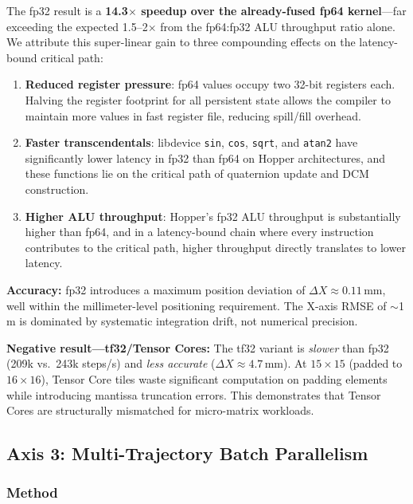 \documentclass[pdflatex,sn-mathphys-num]{sn-jnl}%
\theoremstyle{thmstyleone}%
\theoremstyle{thmstyletwo}%
\theoremstyle{thmstylethree}%
\begin{document}
The fp32 result is a \textbf{14.3$\times$ speedup over the already-fused fp64 kernel}---far exceeding the expected 1.5--2$\times$ from the fp64:fp32 ALU throughput ratio alone. We attribute this super-linear gain to three compounding effects on the latency-bound critical path:

\begin{enumerate}
\item \textbf{Reduced register pressure}: fp64 values occupy two 32-bit registers each. Halving the register footprint for all persistent state allows the compiler to maintain more values in fast register file, reducing spill/fill overhead.
\item \textbf{Faster transcendentals}: libdevice \texttt{sin}, \texttt{cos}, \texttt{sqrt}, and \texttt{atan2} have significantly lower latency in fp32 than fp64 on Hopper architectures, and these functions lie on the critical path of quaternion update and DCM construction.
\item \textbf{Higher ALU throughput}: Hopper's fp32 ALU throughput is substantially higher than fp64, and in a latency-bound chain where every instruction contributes to the critical path, higher throughput directly translates to lower latency.
\end{enumerate}

\textbf{Accuracy:} fp32 introduces a maximum position deviation of $\Delta X \approx 0.11$\,mm, well within the millimeter-level positioning requirement. The X-axis RMSE of $\sim$1\,m is dominated by systematic integration drift, not numerical precision.

\textbf{Negative result---tf32/Tensor Cores:} The tf32 variant is \textit{slower} than fp32 (209k vs.~243k steps/s) and \textit{less accurate} ($\Delta X \approx 4.7$\,mm). At $15\times15$ (padded to $16\times16$), Tensor Core tiles waste significant computation on padding elements while introducing mantissa truncation errors. This demonstrates that Tensor Cores are structurally mismatched for micro-matrix workloads.

\subsection{Axis 3: Multi-Trajectory Batch Parallelism}\label{subsec:batch}

\subsubsection{Method}
\end{document}
